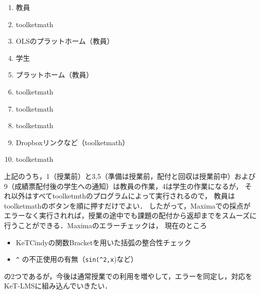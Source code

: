 \documentclass[a4j,12pt]{ujarticle}
\begin{document}
\begin{enumerate}
\item {}教員\vspace{-2mm}
\item {}toolketmath\vspace{-2mm}
\item {}OLSのプラットホーム（教員）\vspace{-2mm}
\item {}学生\vspace{-2mm}
\item {}プラットホーム（教員）\vspace{-2mm}
\item {}toolketmath\vspace{-2mm}
\item {}toolketmath\vspace{-2mm}
\item {}toolketmath\vspace{-2mm}
\item {}Dropboxリンクなど（toolketmath）\vspace{-2mm}
\item {}toolketmath\vspace{-2mm}
\end{enumerate}

上記のうち，1（授業前）と3,5（準備は授業前，配付と回収は授業前中）および9（成績票配付後の学生への通知）は教員の作業，4は学生の作業になるが，
それ以外はすべてtoolketmthのプログラムによって実行されるので，
教員はtoolketmathのボタンを順に押すだけでよい．
したがって，Maximaでの採点がエラーなく実行されれば，授業の途中でも課題の配付から返却までをスムーズに行うことができる．Maximaのエラーチェックは，
現在のところ\vspace{-2mm}
\begin{itemize}
\item KeTCindyの関数Bracketを用いた括弧の整合性チェック\vspace{-2mm}
\item \verb|^| の不正使用の有無（\verb|sin(^2,x|)など）\vspace{-2mm}
\end{itemize}
の2つであるが，今後は通常授業での利用を増やして，エラーを同定し，対応をKeT-LMSに組み込んでいきたい．
\end{document}
